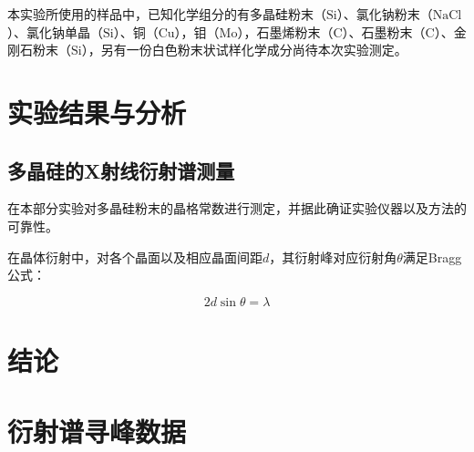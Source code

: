 \documentclass{thuemp}
\begin{document}
本实验所使用的样品中，已知化学组分的有多晶硅粉末（$\text{Si}$）、氯化钠粉末（$\text{NaCl}$）、氯化钠单晶（$\text{Si}$）、铜（$\text{Cu}$），钼（$\text{Mo}$），石墨烯粉末（$\text{C}$）、石墨粉末（$\text{C}$）、金刚石粉末（$\text{Si}$），另有一份白色粉末状试样化学成分尚待本次实验测定。

\section{实验结果与分析}

\subsection{多晶硅的X射线衍射谱测量}

在本部分实验对多晶硅粉末的晶格常数进行测定，并据此确证实验仪器以及方法的可靠性。

在晶体衍射中，对各个晶面以及相应晶面间距$d$，其衍射峰对应衍射角$\theta$满足Bragg公式：

\begin{equation}
    2d\sin\theta  = \lambda
\end{equation}

\section{结论}



\renewcommand\refname{\heiti\wuhao\centerline{参考文献}\global\def\refname{参考文献}}
\vskip 12pt


\let\OLDthebibliography\thebibliography
\renewcommand\thebibliography[1]{
  \OLDthebibliography{#1}
  \setlength{\parskip}{0pt}
  \setlength{\itemsep}{0pt plus 0.3ex}
}

{
\renewcommand{\baselinestretch}{0.9}
\liuhao


}

\appendix
\section{衍射谱寻峰数据}
\end{document}
